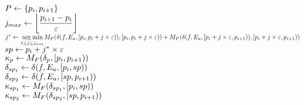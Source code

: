 \begin{algorithm}[t!]
{{			$P \leftarrow \{p_{i},p_{i+1}\} $ \\  
			$j_{max} \leftarrow  \bigg\lfloor{\dfrac{p_{i+1} - p_{i}}{\varepsilon}} \bigg\rfloor$  \\
			{\scriptsize $j^* \leftarrow \underset{1\leq j \leq j_{max}}{\operatorname{arg\hspace{1mm}min}}M_{F}(\delta(f,E_a,[p_{i},p_{i}+j\times \varepsilon)),[p_{i},p_{i}+j\times\varepsilon)) + M_{F}(\delta(f,E_a,[p_{i}+j\times\varepsilon,p_{i+1})),[p_{i}+j\times\varepsilon,p_{i+1}))$} \\
			$sp \leftarrow p_{i}+j^*\times \varepsilon$  \\
			$\kappa_{p}\leftarrow M_{F}(\delta_{p},[p_{i}, p_{i+1}))$  \\
			
			$\delta_{sp_1} \leftarrow \delta(f,E_a,[p_{i}, sp))$  \\
			$\delta_{sp_2} \leftarrow \delta(f,E_a,[sp,p_{i+1}))$\\
			$\kappa_{sp_1}\leftarrow M_{F}(\delta_{sp_1},[p_{i}, sp))$   \\
			$\kappa_{sp_2}\leftarrow M_{F}(\delta_{sp_2},[sp, p_{i+1}))$ \\
			
}}
\end{algorithm}

